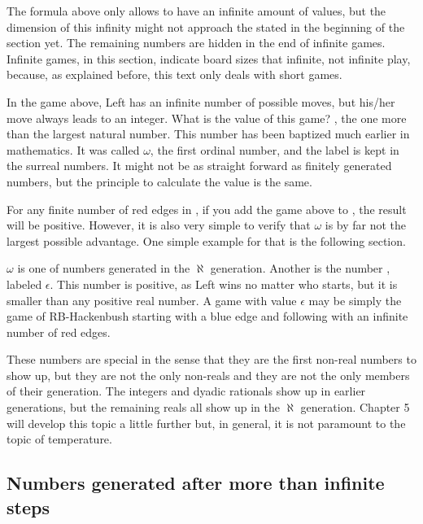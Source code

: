 The formula above only allows \Gm{} to have an infinite amount of values, but the dimension of this infinity might not approach the stated in the beginning of the section yet. The remaining numbers are hidden in the end of infinite games. Infinite games, in this section, indicate board sizes that infinite, not infinite play, because, as explained before, this text only deals with short games. 



In the game above, Left has an infinite number of possible moves, but his/her move always leads to an integer. What is the value of this game? , the one more than the largest natural number. This number has been baptized much earlier in mathematics. It was called $\omega$, the first ordinal number, and the label is kept in the surreal numbers. It might not be as straight forward as finitely generated numbers, but the principle to calculate the value is the same.

For any finite number of red edges in \Gm{}, if you add the game above to \Gm{}, the result will be positive. However, it is also very simple to verify that $\omega$ is by far not the largest possible advantage. One simple  example for that is the following section.

$\omega$ is one of numbers generated in the $\aleph$ generation. Another is the number , labeled $\epsilon$. This number is positive, as Left wins no matter who starts, but it is smaller than any positive real number. A game with value $\epsilon$ may be simply the game of RB-Hackenbush starting with a blue edge and following with an infinite number of red edges.

These numbers are special in the sense that they are the first non-real numbers to show up, but they are not the only non-reals and they are not the only members of their generation. The integers and dyadic rationals show up in earlier generations, but the remaining reals all show up in the $\aleph$ generation. Chapter 5 will develop this topic a little further but, in general, it is not paramount to the topic of temperature.

\subsection*{Numbers generated after more than infinite steps}




